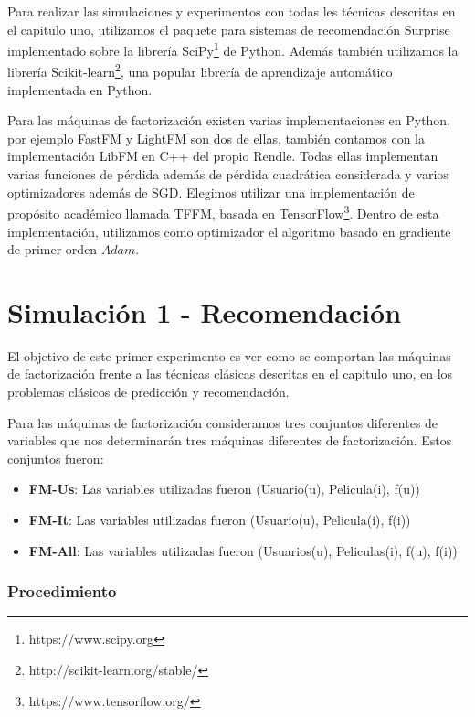 \documentclass[hidelinks,12pt,a4paper]{book}
\theoremstyle{plain}
\theoremstyle{definition}
\begin{document}
Para realizar las simulaciones y experimentos con todas les técnicas descritas en el capitulo uno, utilizamos el paquete para sistemas de recomendación Surprise\cite{Surprise} implementado sobre la librería SciPy\footnote{https://www.scipy.org} de Python. Además también utilizamos la librería Scikit-learn\footnote{http://scikit-learn.org/stable/}, una popular librería de aprendizaje automático implementada en Python. 

Para las máquinas de factorización existen varias implementaciones en Python, por ejemplo FastFM\cite{fastfm} y LightFM\cite{lightfm} son dos de ellas, también contamos con la implementación LibFM en C++\cite{rendle2012factorization} del propio Rendle. Todas ellas implementan varias funciones de pérdida además de pérdida cuadrática considerada y varios optimizadores además de SGD. Elegimos utilizar una implementación de propósito académico llamada TFFM\cite{tffm2016}, basada en TensorFlow\footnote{https://www.tensorflow.org/}. Dentro de esta implementación, utilizamos como optimizador el algoritmo basado en gradiente de primer orden $Adam$\cite{kingma2014adam}.

\section{Simulación 1 - Recomendación}

El objetivo de este primer experimento es ver como se comportan las máquinas de factorización frente a las técnicas clásicas descritas en el capitulo uno, en los problemas clásicos de predicción y recomendación. 

Para las máquinas de factorización consideramos tres conjuntos diferentes de variables que nos determinarán tres máquinas diferentes de factorización. Estos conjuntos fueron:

\begin{itemize}
\item \textbf{FM-Us}: Las variables utilizadas fueron (Usuario(u), Pelicula(i), f(u))
\item \textbf{FM-It}: Las variables utilizadas fueron (Usuario(u), Pelicula(i), f(i))
\item \textbf{FM-All}: Las variables utilizadas fueron (Usuarios(u), Peliculas(i), f(u), f(i))
\end{itemize}

\subsubsection{Procedimiento}
\end{document}
